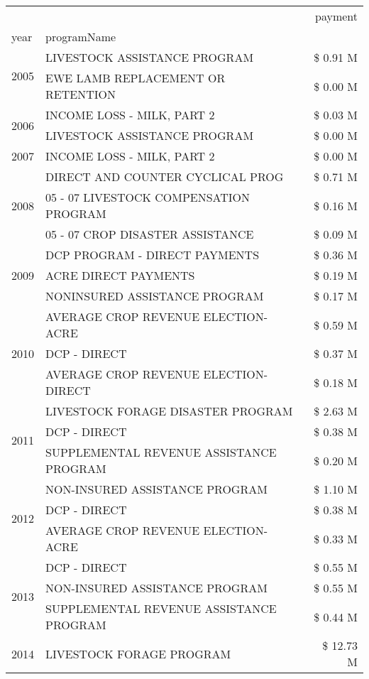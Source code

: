 \begin{tabular}{llr}
\toprule
 &  & payment \\
year & programName &  \\
\midrule
\multirow[t]{2}{*}{2005} & LIVESTOCK ASSISTANCE PROGRAM & \$ 0.91 M \\
 & EWE LAMB REPLACEMENT OR RETENTION & \$ 0.00 M \\
\cline{1-3}
\multirow[t]{2}{*}{2006} & INCOME LOSS - MILK, PART 2 & \$ 0.03 M \\
 & LIVESTOCK ASSISTANCE PROGRAM & \$ 0.00 M \\
\cline{1-3}
2007 & INCOME LOSS - MILK, PART 2 & \$ 0.00 M \\
\cline{1-3}
\multirow[t]{3}{*}{2008} & DIRECT AND COUNTER CYCLICAL PROG & \$ 0.71 M \\
 & 05 - 07 LIVESTOCK COMPENSATION PROGRAM & \$ 0.16 M \\
 & 05 - 07 CROP DISASTER ASSISTANCE & \$ 0.09 M \\
\cline{1-3}
\multirow[t]{3}{*}{2009} & DCP PROGRAM - DIRECT PAYMENTS & \$ 0.36 M \\
 & ACRE DIRECT PAYMENTS & \$ 0.19 M \\
 & NONINSURED ASSISTANCE PROGRAM & \$ 0.17 M \\
\cline{1-3}
\multirow[t]{3}{*}{2010} & AVERAGE CROP REVENUE ELECTION-ACRE & \$ 0.59 M \\
 & DCP - DIRECT & \$ 0.37 M \\
 & AVERAGE CROP REVENUE ELECTION-DIRECT & \$ 0.18 M \\
\cline{1-3}
\multirow[t]{3}{*}{2011} & LIVESTOCK FORAGE DISASTER PROGRAM & \$ 2.63 M \\
 & DCP - DIRECT & \$ 0.38 M \\
 & SUPPLEMENTAL REVENUE ASSISTANCE PROGRAM & \$ 0.20 M \\
\cline{1-3}
\multirow[t]{3}{*}{2012} & NON-INSURED ASSISTANCE PROGRAM & \$ 1.10 M \\
 & DCP - DIRECT & \$ 0.38 M \\
 & AVERAGE CROP REVENUE ELECTION-ACRE & \$ 0.33 M \\
\cline{1-3}
\multirow[t]{3}{*}{2013} & DCP - DIRECT & \$ 0.55 M \\
 & NON-INSURED ASSISTANCE PROGRAM & \$ 0.55 M \\
 & SUPPLEMENTAL REVENUE ASSISTANCE PROGRAM & \$ 0.44 M \\
\cline{1-3}
\multirow[t]{3}{*}{2014} & LIVESTOCK FORAGE PROGRAM & \$ 12.73 M \\

\end{tabular}
